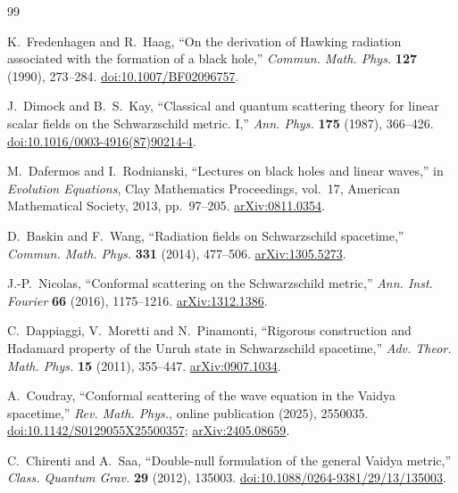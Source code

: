 \documentclass[11pt,a4paper]{article}
\theoremstyle{definition}
\theoremstyle{remark}
\begin{document}
	\begin{thebibliography}{99}
		
		K.~Fredenhagen and R.~Haag,
		``On the derivation of Hawking radiation associated with the formation of a
		black hole,''
		\emph{Commun. Math. Phys.} \textbf{127} (1990), 273--284.
		\href{https://doi.org/10.1007/BF02096757}{doi:10.1007/BF02096757}.
		
		J.~Dimock and B.~S.~Kay,
		``Classical and quantum scattering theory for linear scalar fields on the
		Schwarzschild metric. I,''
		\emph{Ann. Phys.} \textbf{175} (1987), 366--426.
		\href{https://doi.org/10.1016/0003-4916(87)90214-4}
		{doi:10.1016/0003-4916(87)90214-4}.
		
		M.~Dafermos and I.~Rodnianski,
		``Lectures on black holes and linear waves,'' in
		\emph{Evolution Equations}, Clay Mathematics Proceedings, vol.~17,
		American Mathematical Society, 2013, pp.~97--205.
		\href{https://arxiv.org/abs/0811.0354}{arXiv:0811.0354}.
		
		D.~Baskin and F.~Wang,
		``Radiation fields on Schwarzschild spacetime,''
		\emph{Commun. Math. Phys.} \textbf{331} (2014), 477--506.
		\href{https://arxiv.org/abs/1305.5273}{arXiv:1305.5273}.
		
		J.-P.~Nicolas,
		``Conformal scattering on the Schwarzschild metric,''
		\emph{Ann. Inst. Fourier} \textbf{66} (2016), 1175--1216.
		\href{https://arxiv.org/abs/1312.1386}{arXiv:1312.1386}.
		
		C.~Dappiaggi, V.~Moretti and N.~Pinamonti,
		``Rigorous construction and Hadamard property of the Unruh state in
		Schwarzschild spacetime,''
		\emph{Adv. Theor. Math. Phys.} \textbf{15} (2011), 355--447.
		\href{https://arxiv.org/abs/0907.1034}{arXiv:0907.1034}.
		
		A.~Coudray,
		``Conformal scattering of the wave equation in the Vaidya spacetime,''
		\emph{Rev. Math. Phys.}, online publication (2025), 2550035.
		\href{https://doi.org/10.1142/S0129055X25500357}%
		{doi:10.1142/S0129055X25500357};
		\href{https://arxiv.org/abs/2405.08659}{arXiv:2405.08659}.
		
		C.~Chirenti and A.~Saa,
		``Double-null formulation of the general Vaidya metric,''
		\emph{Class. Quantum Grav.} \textbf{29} (2012), 135003.
		\href{https://doi.org/10.1088/0264-9381/29/13/135003}%
		{doi:10.1088/0264-9381/29/13/135003}.
		

\end{thebibliography}
\end{document}
